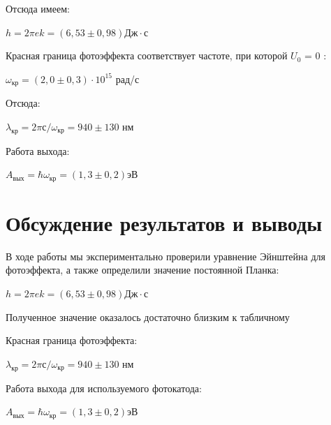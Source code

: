 \documentclass[12pt,a4paper]{article}
\begin{document}
Отсюда имеем:
\begin{center}
$h=2\pi e k = (6,53 \pm 0,98)\text{Дж}\cdot\text{с}$
\end{center}

	Красная граница фотоэффекта соответствует частоте, при которой $U_0$ = 0 :
\begin{center}
$\omega_\text{кр}=(2,0 \pm 0,3)\cdot 10^{15} $ рад/с
\end{center}

Отсюда:
\begin{center}
$\lambda_\text{кр} = 2\pi с / \omega_\text{кр} = 940 \pm 130$ нм
\end{center}

Работа выхода:
\begin{center}
$A_\text{вых} = \hbar \omega_\text{кр} = (1,3 \pm 0,2)$эВ
\end{center}



\section{Обсуждение результатов и выводы}
	В ходе работы мы экспериментально проверили уравнение Эйнштейна для фотоэффекта, а также определили значение постоянной Планка:
	
	\begin{center}
$h=2\pi e k = (6,53 \pm 0,98)\text{Дж}\cdot\text{с}$
\end{center}

Полученное значение оказалось достаточно близким к табличному

Красная граница фотоэффекта:

\begin{center}
$\lambda_\text{кр} = 2\pi с / \omega_\text{кр} = 940 \pm 130$ нм
\end{center}

Работа выхода для используемого фотокатода:

\begin{center}
$A_\text{вых} = \hbar \omega_\text{кр} = (1,3 \pm 0,2)$эВ
\end{center}	
	
\end{document}

